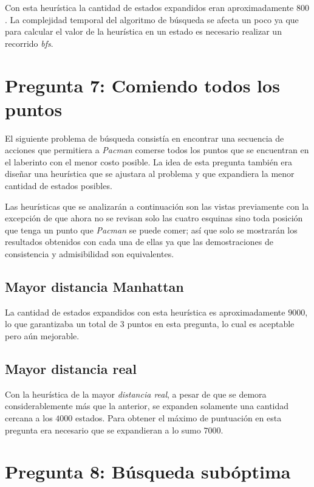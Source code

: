\documentclass[12pt]{article}
\begin{document}
Con esta heur\'istica la cantidad de estados expandidos eran aproximadamente $800$. La complejidad temporal del algoritmo de b\'usqueda se afecta un poco ya que para calcular el valor de la heur\'istica en un estado es necesario realizar un recorrido \emph{bfs}.

\section{Pregunta 7: Comiendo todos los puntos}

El siguiente problema de b\'usqueda consist\'ia en encontrar una secuencia de acciones que permitiera a \emph{Pacman} comerse todos los puntos que se encuentran en el laberinto con el menor costo posible. La idea de esta pregunta tambi\'en era dise\~nar una heur\'istica que se ajustara al problema y que expandiera la menor cantidad de estados posibles.

Las heur\'isticas que se analizar\'an a continuaci\'on son las vistas previamente con la excepci\'on de que ahora no se revisan solo las cuatro esquinas sino toda posici\'on que tenga un punto que \emph{Pacman} se puede comer; as\'i que solo se mostrar\'an los resultados obtenidos con cada una de ellas ya que las demostraciones de consistencia y admisibilidad son equivalentes.

\subsection{Mayor distancia Manhattan}

La cantidad de estados expandidos con esta heur\'istica es aproximadamente $9000$, lo que garantizaba un total de $3$ puntos en esta pregunta, lo cual es aceptable pero a\'un mejorable.

\subsection{Mayor distancia real}

Con la heur\'istica de la mayor \emph{distancia real}, a pesar de que se demora considerablemente m\'as que la anterior, se expanden solamente una cantidad cercana a los $4000$ estados. Para obtener el m\'aximo de puntuaci\'on en esta pregunta era necesario que se expandieran a lo sumo $7000$.


\section{Pregunta 8: B\'usqueda sub\'optima}
\end{document}
